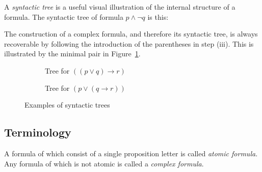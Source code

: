 \documentclass[nobib,nofonts]{tufte-handout}
\newcommand{\proplog}{\acro{PropLog}}
\begin{document}
A \emph{syntactic tree} is a useful visual illustration of the internal structure of a formula.
The syntactic tree of formula $p \wedge \neg q$ is this:

\begin{center}
\end{center}

The construction of a complex formula, and therefore its syntactic tree, is always recoverable by following the introduction of the parentheses in step (iii).
This is illustrated by the minimal pair in Figure~\ref{fig:syntactic-trees}.

\begin{figure}
  \centering

  \begin{subfigure}[b]{0.45\textwidth}
    \caption{Tree for $((p \vee q) \rightarrow r)$}
  \end{subfigure}
  \hfill
  \begin{subfigure}[b]{0.45\textwidth}
    \caption{Tree for $(p \vee (q \rightarrow r))$}
  \end{subfigure}

  \caption{Examples of syntactic trees}
  \label{fig:syntactic-trees}
\end{figure}

\subsection{Terminology}

A formula of \proplog which consist of a single proposition letter is called \emph{atomic formula.}
Any formula of \proplog which is not atomic is called a \emph{complex formula}.
\end{document}
